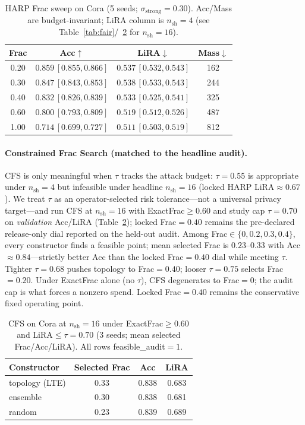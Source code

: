 \documentclass[conference]{IEEEtran}
\begin{document}
\begin{table}[!t]
\caption{HARP Frac sweep on Cora (5 seeds; $\sigma_{\mathrm{strong}}{=}0.30$). Acc/Mass are budget-invariant; LiRA column is $n_{\mathrm{sh}}{=}4$ (see Table~\ref{tab:fair}/~\ref{tab:cfs} for $n_{\mathrm{sh}}{=}16$).}
\label{tab:frac}
\centering
\scriptsize
\begin{tabular}{@{}cccc@{}}
\toprule
\textbf{Frac} & \textbf{Acc}$\uparrow$ & \textbf{LiRA}$\downarrow$ & \textbf{Mass}$\downarrow$ \\
\midrule
0.20 & $0.859\,[0.855,0.866]$ & $0.537\,[0.532,0.543]$ & 162 \\
0.30 & $0.847\,[0.843,0.853]$ & $0.538\,[0.533,0.543]$ & 244 \\
0.40 & $0.832\,[0.826,0.839]$ & $0.533\,[0.525,0.541]$ & 325 \\
0.60 & $0.800\,[0.793,0.809]$ & $0.519\,[0.512,0.526]$ & 487 \\
1.00 & $0.714\,[0.699,0.727]$ & $0.511\,[0.503,0.519]$ & 812 \\
\bottomrule
\end{tabular}
\end{table}

\paragraph{Constrained Frac Search (matched to the headline audit).}
CFS is only meaningful when $\tau$ tracks the attack budget: $\tau{=}0.55$ is appropriate under $n_{\mathrm{sh}}{=}4$ but infeasible under headline $n_{\mathrm{sh}}{=}16$ (locked HARP LiRA${\approx}0.67$).
We treat $\tau$ as an operator-selected risk tolerance---not a universal privacy target---and run CFS at $n_{\mathrm{sh}}{=}16$ with ExactFrac$\ge 0.60$ and study cap $\tau{=}0.70$ on \emph{validation} Acc/LiRA (Table~\ref{tab:cfs}); locked Frac${=}0.40$ remains the pre-declared release-only dial reported on the held-out audit.
Among Frac$\in\{0,0.2,0.3,0.4\}$, every constructor finds a feasible point; mean selected Frac is $0.23$--$0.33$ with Acc${\approx}0.84$---strictly better Acc than the locked Frac${=}0.40$ dial while meeting $\tau$.
Tighter $\tau{=}0.68$ pushes topology to Frac${=}0.40$; looser $\tau{=}0.75$ selects Frac${=}0.20$.
Under ExactFrac alone (no $\tau$), CFS degenerates to Frac${=}0$; the audit cap is what forces a nonzero spend.
Locked Frac${=}0.40$ remains the conservative fixed operating point.

\begin{table}[!t]
\caption{CFS on Cora at $n_{\mathrm{sh}}{=}16$ under ExactFrac$\ge 0.60$ and LiRA$\le\tau{=}0.70$ (3 seeds; mean selected Frac/Acc/LiRA). All rows feasible\_audit${=}1$.}
\label{tab:cfs}
\centering
\scriptsize
\begin{tabular}{@{}lccc@{}}
\toprule
\textbf{Constructor} & \textbf{Selected Frac} & \textbf{Acc} & \textbf{LiRA} \\
\midrule
topology (LTE) & 0.33 & 0.838 & 0.683 \\
ensemble & 0.30 & 0.838 & 0.681 \\
random & 0.23 & 0.839 & 0.689 \\
\bottomrule
\end{tabular}
\end{table}
\end{document}
